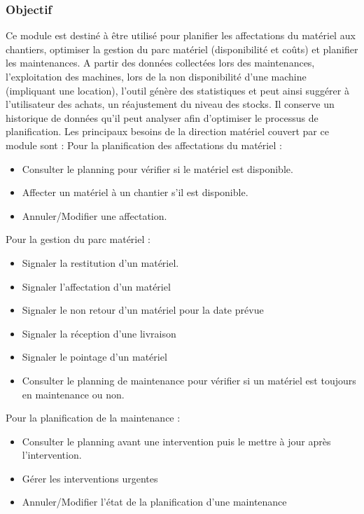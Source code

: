 	    \subsubsection{Objectif}
	    Ce module est destiné à être utilisé pour planifier les affectations du matériel aux chantiers, optimiser la gestion du parc matériel (disponibilité et coûts) et planifier les maintenances.
	    A partir des données collectées lors des maintenances, l'exploitation des machines, lors de la non disponibilité d'une machine (impliquant une location), l'outil génère des statistiques et peut ainsi suggérer à l'utilisateur des achats, un réajustement du niveau des stocks.
	    Il conserve un historique de données qu'il peut analyser afin d'optimiser le processus de planification. Les principaux besoins de la direction matériel couvert par ce module sont :
            Pour la planification des affectations du matériel :
                   \begin{itemize}
	                   \item Consulter le planning pour vérifier si le matériel est disponible.
	                   \item Affecter un matériel à un chantier s'il est disponible.
	                   \item Annuler/Modifier une affectation.
                   \end{itemize}

            Pour la gestion du parc matériel :
                   \begin{itemize}
	                   \item Signaler la restitution d'un matériel.
	                   \item Signaler l'affectation d'un matériel
	                   \item Signaler le non retour d'un matériel pour la date prévue
	                   \item Signaler la réception d'une livraison
	                   \item Signaler le pointage d'un matériel
	                   \item Consulter le planning de maintenance pour vérifier si un matériel est toujours en maintenance ou non.
                   \end{itemize}

            Pour la planification de la maintenance :
                   \begin{itemize}
	                   \item Consulter le planning avant une intervention puis le mettre à jour après l'intervention.
	                   \item Gérer les interventions urgentes
	                   \item Annuler/Modifier l'état de la planification d'une maintenance
                   \end{itemize}

